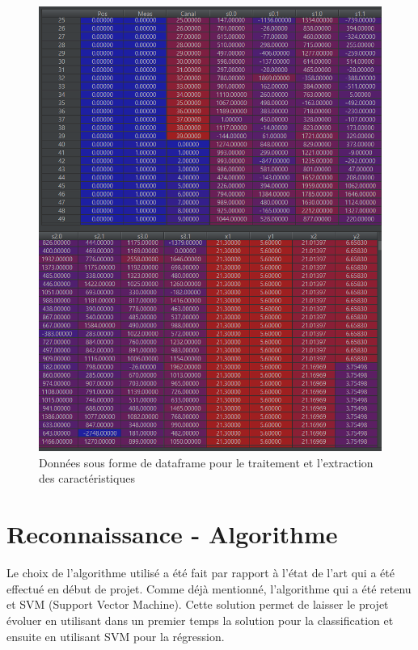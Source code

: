 \begin{figure}[H]
	\begin{center}
		\includegraphics[scale=0.6]{figures/dataframe2.png}
		\caption{Données sous forme de dataframe pour le traitement et l'extraction des caractéristiques}
		\label{fig:dataframe} %
	\end{center}
\end{figure}

\section{Reconnaissance - Algorithme}
Le choix de l'algorithme utilisé a été fait par rapport à l'état de l'art qui a été effectué en début de projet. Comme déjà mentionné, l'algorithme qui a été retenu et SVM (Support Vector Machine). Cette solution permet de laisser le projet évoluer en utilisant dans un premier temps la solution pour la classification et ensuite en utilisant SVM pour la régression. 

